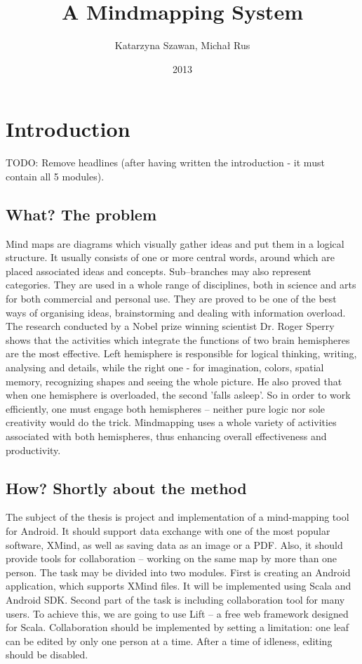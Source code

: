 \documentclass[american]{bsc}
\title{A Mindmapping System}
\author{Katarzyna Szawan, Michał Rus}
\date{2013}
\begin{document}
\maketitle

\chapter{Introduction}
\label{chap:introduction}
TODO: Remove headlines (after having written the introduction - it must contain all 5 modules). 
\section{What? The problem}
\label{sec:what}
Mind maps are diagrams which visually gather ideas and put them in a logical structure. It usually consists of one or more central words, around which are placed associated ideas and concepts. Sub--branches may also represent categories.  They are used in a whole range of disciplines, both in science and arts for both commercial and personal use. They are proved to be one of the best ways of organising ideas, brainstorming and dealing with information overload. The research conducted by a Nobel prize winning scientist Dr. Roger Sperry shows that the activities which integrate the functions of two brain hemispheres are the most effective. Left hemisphere is responsible for logical thinking, writing, analysing and details, while the right one - for imagination, colors, spatial memory, recognizing shapes and seeing the whole picture. He also proved that when one hemisphere is overloaded, the second 'falls asleep'. So in order to work efficiently, one must engage both hemispheres -- neither pure logic nor sole creativity would do the trick. Mindmapping uses a whole variety of activities associated with both hemispheres, thus enhancing overall effectiveness and productivity. 

\section{How? Shortly about the method}
\label{sec:how}
The subject of the thesis is project and implementation of a mind-mapping tool for Android. It should support data exchange with one of the most popular software, XMind, as well as saving data as an image or a PDF. Also, it should provide tools for collaboration -- working on the same map by more than one person. The task may be divided into two modules. First is creating an Android application, which supports XMind files. It will be implemented using Scala and Android SDK. Second part of the task is including collaboration tool for many users. To achieve this, we are going to use Lift -- a free web framework  designed for Scala. Collaboration should be implemented by setting a limitation: one leaf can be edited by only one person at a time. After a time of idleness, editing should be disabled.
\end{document}

